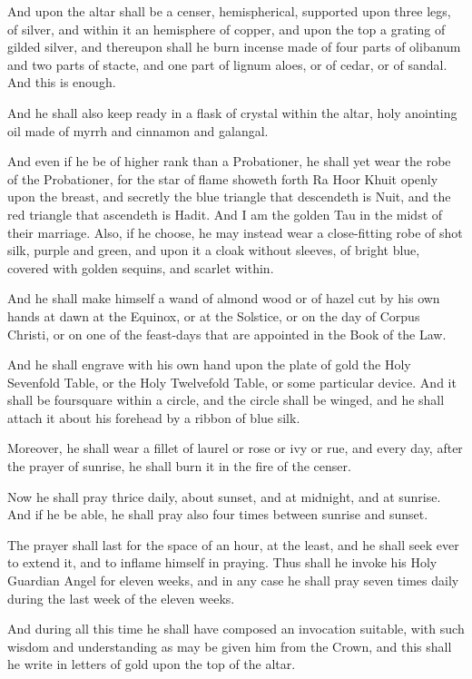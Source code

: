 And upon the altar shall be a censer, hemispherical, supported upon three legs, of silver, and within it an hemisphere of copper, and upon the top a grating of gilded silver, and thereupon shall he burn incense made of four parts of olibanum and two parts of stacte, and one part of lignum aloes, or of cedar, or of sandal. And this is enough.

And he shall also keep ready in a flask of crystal within the altar, holy anointing oil made of myrrh and cinnamon and galangal.

And even if he be of higher rank than a Probationer, he shall yet wear the robe of the Probationer, for the star of flame showeth forth Ra Hoor Khuit openly upon the breast, and secretly the blue triangle that descendeth is Nuit, and the red triangle that ascendeth is Hadit. And I am the golden Tau in the midst of their marriage. Also, if he choose, he may instead wear a close-fitting robe of shot silk, purple and green, and upon it a cloak without sleeves, of bright blue, covered with golden sequins, and scarlet within.

And he shall make himself a wand of almond wood or of hazel cut by his own hands at dawn at the Equinox, or at the Solstice, or on the day of Corpus Christi, or on one of the feast-days that are appointed in the Book of the Law.

And he shall engrave with his own hand upon the plate of gold the Holy Sevenfold Table, or the Holy Twelvefold Table, or some particular device. And it shall be foursquare within a circle, and the circle shall be winged, and he shall attach it about his forehead by a ribbon of blue silk.

Moreover, he shall wear a fillet of laurel or rose or ivy or rue, and every day, after the prayer of sunrise, he shall burn it in the fire of the censer.

Now he shall pray thrice daily, about sunset, and at midnight, and at sunrise. And if he be able, he shall pray also four times between sunrise and sunset.

The prayer shall last for the space of an hour, at the least, and he shall seek ever to extend it, and to inflame himself in praying. Thus shall he invoke his Holy Guardian Angel for eleven weeks, and in any case he shall pray seven times daily during the last week of the eleven weeks.

And during all this time he shall have composed an invocation suitable, with such wisdom and understanding as may be given him from the Crown, and this shall he write in letters of gold upon the top of the altar.


